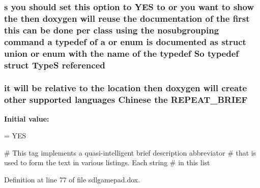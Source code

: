 \hypertarget{sdlgamepad_8dox_ac263f06ace5c014824e336d270a831d2}{
\subsubsection[{referenced}]{ {\bf s} you should {\bf set} this option to Y\-E\-S to or you want to show the then doxygen will reuse the documentation of the {\bf first} this can be {\bf done} per class using the nosubgrouping command {\bf a} typedef of {\bf a} or enum is documented as {\bf struct} {\bf union} or enum with the {\bf name} of the typedef So typedef {\bf struct} {\bf Type\-S} referenced}}\label{sdlgamepad_8dox_ac263f06ace5c014824e336d270a831d2}
\hypertarget{sdlgamepad_8dox_a97488cf1b604b4e0594c9a044197735c}{
\subsubsection[{R\-E\-P\-E\-A\-T\-\_\-\-B\-R\-I\-E\-F}]{\setlength{\rightskip}{0pt plus 5cm}it will be relative to the {\bf location} then doxygen will create other supported languages {\bf Chinese} the R\-E\-P\-E\-A\-T\-\_\-\-B\-R\-I\-E\-F}}\label{sdlgamepad_8dox_a97488cf1b604b4e0594c9a044197735c}
{\bfseries Initial value\-:}
\begin{DoxyCode}
= YES

\textcolor{preprocessor}{# This tag implements a quasi-intelligent brief description abbreviator}
\textcolor{preprocessor}{}\textcolor{preprocessor}{# that is used to form the text in various listings. Each string}
\textcolor{preprocessor}{# in this list}
\end{DoxyCode}


Definition at line 77 of file sdlgamepad.\-dox.

